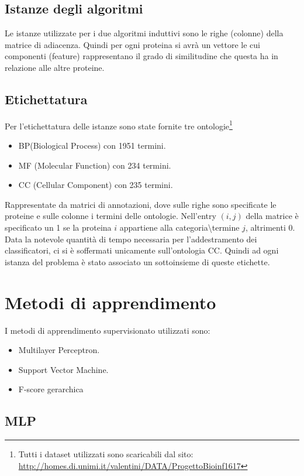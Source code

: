 \documentclass{article}
\begin{document}
\subsection{Istanze degli algoritmi}
Le istanze utilizzate per i due algoritmi induttivi sono le righe (colonne) della matrice di adiacenza. Quindi per ogni proteina si avrà un vettore le cui componenti (feature) rappresentano il grado di similitudine che questa ha in relazione alle altre proteine. 

\subsection{Etichettatura}
Per l'etichettatura delle istanze sono state fornite tre ontologie\footnote{Tutti i dataset utilizzati sono scaricabili dal sito:
\url{http://homes.di.unimi.it/valentini/DATA/ProgettoBioinf1617}}
\begin{itemize}
\item BP(Biological Process) con 1951 termini.
\item MF (Molecular Function) con 234 termini.
\item CC (Cellular Component) con 235 termini.
\end{itemize} 
Rappresentate da matrici di annotazioni, dove sulle righe sono specificate le proteine e sulle colonne i termini delle ontologie. Nell'entry $(i,j)$ della matrice è specificato un 1 se la proteina $i$ appartiene alla categoria\textbackslash termine $j$, altrimenti 0.
\newline
\newline
Data la notevole quantità di tempo necessaria per l'addestramento dei classificatori, ci si è soffermati unicamente sull'ontologia CC. Quindi ad ogni istanza del problema è stato associato un sottoinsieme di queste etichette.

\section{Metodi di apprendimento}

I metodi di apprendimento supervisionato utilizzati sono:
\begin{itemize}
\item Multilayer Perceptron.
\item Support Vector Machine.
\item F-score gerarchica
\end{itemize}

\subsection{MLP}
\end{document}
